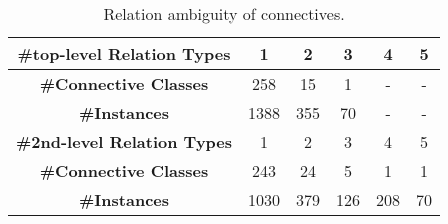 \begin{table}[ht]
\centering
\begin{tabular}{|c|c|c|c|c|c|}
\hline
\bf \#top-level Relation Types & 1    & 2   & 3   & 4   & 5  \\ \hline
\bf \#Connective Classes       & 258  & 15  & 1   & -   & -  \\ \hline
\bf \#Instances                & 1388 & 355 & 70  & -   & -  \\ \hline

\hhline{|=|=|=|=|=|=|}

\bf \#2nd-level Relation Types & 1    & 2   & 3   & 4   & 5  \\ \hline
\bf \#Connective Classes       & 243  & 24  & 5   & 1   & 1  \\ \hline
\bf \#Instances                & 1030 & 379 & 126 & 208 & 70 \\ \hline

\end{tabular}
\caption{\label{t:connective-type} Relation ambiguity of connectives. }
\end{table}

